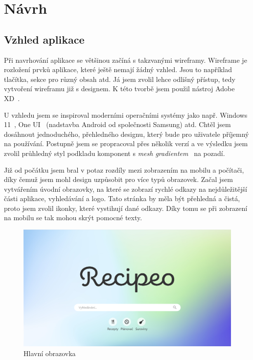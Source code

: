 
\chapter{Návrh}

\section{Vzhled aplikace}

Při navrhování aplikace se většinou začíná s takzvanými wireframy. Wireframe je rozložení prvků aplikace, které ještě
nemají žádný vzhled. Jsou to například tlačítka, sekce pro různý obsah atd. Já jsem zvolil lehce odlišný přístup, tedy
vytvoření wireframu již s designem. K této tvorbě jsem použil nástroj Adobe XD~\cite{AdobeXD}.

U vzhledu jsem se inspiroval moderními operačními systémy jako např. Windows 11~\cite{Windows11}, One UI~\cite{OneUI}
(nadstavba Android od společnosti Samsung) atd.
Chtěl jsem dosáhnout jednoduchého, přehledného designu, který bude pro uživatele příjemný na používání. Postupně jsem se
propracoval přes několik verzí a ve výsledku jsem zvolil průhledný styl podkladu komponent s \emph{mesh gradientem}~\cite{MeshGradients} na pozadí.

Již od počátku jsem bral v potaz rozdíly mezi zobrazením na mobilu a počítači, díky čemuž jsem mohl design uzpůsobit
pro více typů obrazovek. Začal jsem vytvářením úvodní obrazovky, na které se zobrazí rychlé odkazy na nejdůležitější části
aplikace, vyhledávání a logo. Tato stránka by měla být přehledná a čistá, proto jsem zvolil ikonky, které vystihují dané
odkazy. Díky tomu se při zobrazení na mobilu se tak mohou skrýt pomocné texty.

\newpage

\begin{figure}
    \includegraphics[width=\textwidth]{images/main-page}
    \caption{Hlavní obrazovka} \label{picture:recipeo:main-page}
\end{figure}

